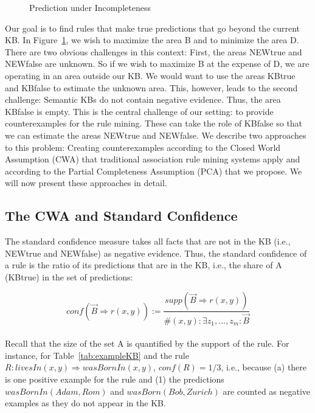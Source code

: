 \begin{figure}[h]
\caption{Prediction under Incompleteness}

\label{fig:prediction}
\end{figure}

Our goal is to find rules that make true predictions that go beyond the current KB.
In Figure~\ref{fig:prediction}, we wish to maximize the area B and to minimize the area D.
There are two obvious challenges in this context: First, the areas NEWtrue and NEWfalse are unknown.
So if we wish to maximize B at the expense of D, we are operating in an area outside our KB.
We would want to use the areas KBtrue and KBfalse to estimate the unknown area.
This, however, leads to the second challenge: Semantic KBs do not contain negative evidence.
Thus, the area KBfalse is empty.
This is the central challenge of our setting: to provide counterexamples for the rule mining.
These can take the role of KBfalse so that we can estimate the areas NEWtrue and NEWfalse.
We describe two approaches to this problem:
Creating counterexamples according to the Closed World Assumption (CWA) that traditional association rule mining systems apply and according to the Partial Completeness Assumption (PCA) that we propose.
We will now present these approaches in detail.



\subsection{The CWA and Standard Confidence} \label{subsubsec:stdConf}
The standard confidence measure takes all facts that are not in the KB (i.e., NEWtrue and NEWfalse) as negative evidence.
Thus, the standard confidence of a rule is the ratio of its predictions that are in the KB, i.e., the share of A (KBtrue) 
in the set of predictions:

\[conf(\vec{B} \Rightarrow r(x,y)) := \frac{supp(\vec{B} \Rightarrow r(x,y))}{\#(x,y): \exists z_1,...,z_m: \vec{B}}\]\\

\noindent Recall that the size of the set A is quantified by the support of the rule.
For instance, for Table~\ref{tab:exampleKB} and the rule $R:livesIn(x,y)\Rightarrow wasBornIn(x,y)$,
$conf(R)=1/3$, i.e., because (a) there is one positive example for the rule and (1) the predictions 
$wasBornIn(Adam, Rom)$ and $wasBorn(Bob,Zurich)$ are counted as negative examples as they do not appear in the KB.

